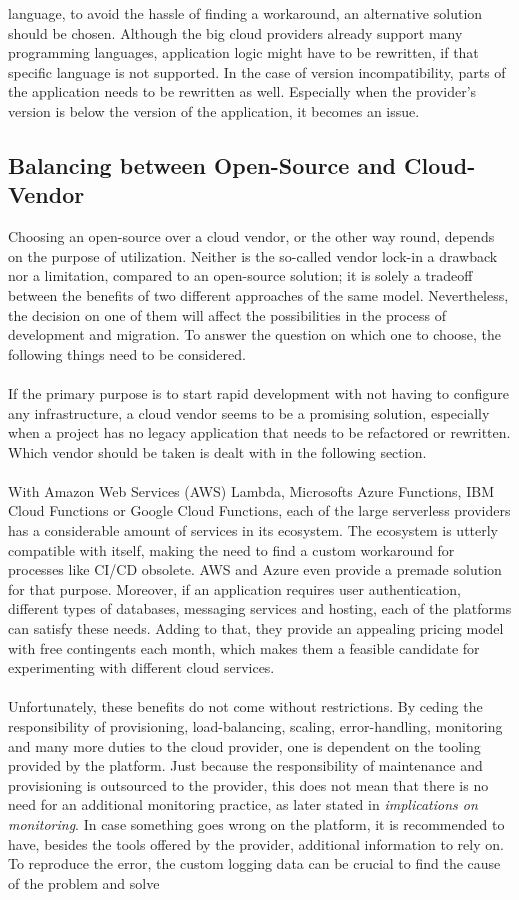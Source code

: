 \documentclass[11pt]{article}
\begin{document}
language, to avoid the hassle of finding a workaround, an alternative solution should be chosen. Although the big cloud providers already support many programming languages, application logic might have to be rewritten, if that specific language is not supported. In the case of version incompatibility, parts of the application needs to be rewritten as well. Especially when the provider's version is below the version of the application, it becomes an issue.
\subsection{Balancing between Open-Source and Cloud-Vendor}
Choosing an open-source over a cloud vendor, or the other way round, depends on the purpose of utilization. Neither is the so-called vendor lock-in a drawback nor a limitation, compared to an open-source solution; it is solely a tradeoff between the benefits of two different approaches of the same model. Nevertheless, the decision on one of them will affect the possibilities in the process of development and migration. To answer the question on which one to choose, the following things need to be considered.\\\\ If the primary purpose is to start rapid development with not having to configure any infrastructure, a cloud vendor seems to be a promising solution, especially when a project has no legacy application that needs to be refactored or rewritten. Which vendor should be taken is dealt with in the following section.\\\\ With Amazon Web Services (AWS) Lambda, Microsofts Azure Functions, IBM Cloud Functions or Google Cloud Functions, each of the large serverless providers has a considerable amount of services in its ecosystem. The ecosystem is utterly compatible with itself, making the need to find a custom workaround for processes like CI/CD obsolete. AWS and Azure even provide a premade solution for that purpose. Moreover, if an application requires user authentication, different types of databases, messaging services and hosting, each of the platforms can satisfy these needs. Adding to that, they provide an appealing pricing model with free contingents each month, which makes them a feasible candidate for experimenting with different cloud services.\\\\ Unfortunately, these benefits do not come without restrictions. By ceding the responsibility of provisioning, load-balancing, scaling, error-handling, monitoring and many more duties to the cloud provider, one is dependent on the tooling provided by the platform. Just because the responsibility of maintenance and provisioning is outsourced to the provider, this does not mean that there is no need for an additional monitoring practice, as later stated in \textit{implications on monitoring}. In case something goes wrong on the platform, it is recommended to have, besides the tools offered by the provider, additional information to rely on. To reproduce the error, the custom logging data can be crucial to find the cause of the problem and solve 
\end{document}
